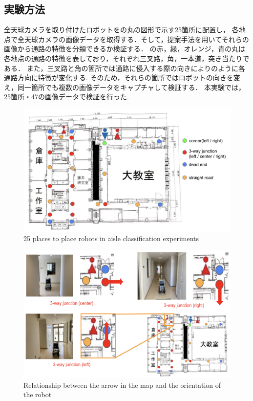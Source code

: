 \documentclass[../main]{subfiles}
\begin{document}
        \subsection{実験方法}
        全天球カメラを取り付けたロボットをの丸の図形で示す25箇所に配置し，
        各地点で全天球カメラの画像データを取得する．そして，提案手法を用いてそれらの画像から通路の特徴を分類できるか検証する．
        の赤，緑，オレンジ，青の丸は各地点の通路の特徴を表しており，それぞれ三叉路，角，一本道，突き当たりである．
        また，三叉路と角の箇所では通路に侵入する際の向きによりのように各通路方向に特徴が変化する.
        そのため，それらの箇所ではロボットの向きを変え，同一箇所でも複数の画像データをキャプチャして検証する．
        本実験では，25箇所・47の画像データで検証を行った.

        \begin{figure}[H]
         \centering
         \includegraphics[width=15.5cm]{../images/experiment_point.png}
         \caption{25 places to place robots in aisle classification experiments}
         \label{figure::experiment_point}
        \end{figure}

        \begin{figure}[H]
         \centering
         \includegraphics[scale=0.43]{../images/robot_direction.png}
         \caption{Relationship between the arrow in the map and the orientation of the robot}
         \label{figure::experiment1}
        \end{figure}
\end{document}
